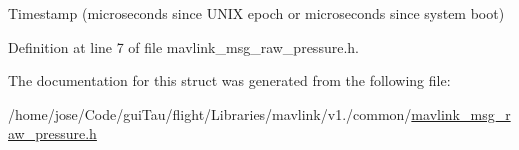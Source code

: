 Timestamp (microseconds since U\-N\-I\-X epoch or microseconds since system boot) 



Definition at line 7 of file mavlink\-\_\-msg\-\_\-raw\-\_\-pressure.\-h.



The documentation for this struct was generated from the following file\-:\begin{DoxyCompactItemize}
\item 
/home/jose/\-Code/gui\-Tau/flight/\-Libraries/mavlink/v1./common/\hyperlink{mavlink__msg__raw__pressure_8h}{mavlink\-\_\-msg\-\_\-raw\-\_\-pressure.\-h}\end{DoxyCompactItemize}

